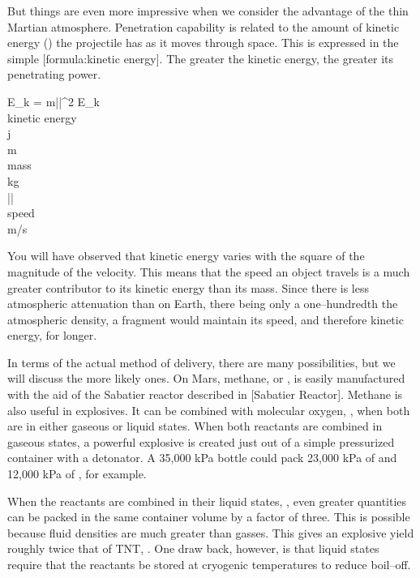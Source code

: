 But things are even more impressive when we consider the advantage of the thin Martian atmosphere. Penetration capability is related to the amount of kinetic energy () the projectile has as it moves through space. This is expressed in the simple [formula:kinetic energy]. The greater the kinetic energy, the greater its penetrating power.

\crlf
{}
\startformula
E_k =  m||^{2}
\stopformula
\startlegend
\leg E_k \\ kinetic energy \\ j \\
\leg m \\ mass \\ kg \\
\leg || \\ speed \\ m/s \\
\stoplegend
\crlf

You will have observed that kinetic energy varies with the square of the magnitude of the velocity. This means that the speed an object travels is a much greater contributor to its kinetic energy than its mass. Since there is less atmospheric attenuation than on Earth, there being only a one--hundredth the atmospheric density, a fragment would maintain its speed, and therefore kinetic energy, for longer.

In terms of the actual method of delivery, there are many possibilities, but we will discuss the more likely ones. On Mars, methane, or , is easily manufactured with the aid of the Sabatier reactor described in [Sabatier Reactor]. Methane is also useful in explosives. It can be combined with molecular oxygen, , when both are in either gaseous or liquid states. When both reactants are combined in gaseous states, a powerful explosive is created just out of a simple pressurized container with a detonator. A 35,000 kPa bottle could pack 23,000 kPa of  and 12,000 kPa of , for example.

When the reactants are combined in their liquid states, , even greater quantities can be packed in the same container volume by a factor of three. This is possible because fluid densities are much greater than gasses. This gives an explosive yield roughly twice that of TNT, . One draw back, however, is that liquid states require that the reactants be stored at cryogenic temperatures to reduce boil--off.

